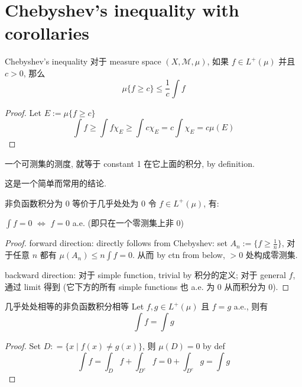 \documentclass[lang=cn,11pt]{elegantbook}
\begin{document}
\section{Chebyshev's inequality with corollaries}

\begin{lemma}{Chebyshev's inequality}
\label{Chebyshev's inequality}
对于 measure space $(X,\mathcal{M}, \mu)$, 如果 $f \in L^+(\mu)$ 并且 $c > 0$, 那么
\[
\mu\{ f \geq c\}  \leq \frac{1}{c} \int f
\]
\end{lemma}\begin{proof}
  Let $E := \mu\{f \geq c\}$
    \[
    \int f \geq \int f \chi_{E} \geq \int c \chi_E = c \int \chi_E = c\mu(E)
    \]
\end{proof}
\begin{remark}
    一个可测集的测度, 就等于 constant 1 在它上面的积分, by definition.

    这是一个简单而常用的结论.
\end{remark}








\begin{proposition}{非负函数积分为 0 等价于几乎处处为 0}
    令 $f \in L^+(\mu)$, 有:
    \begin{center}
        $\displaystyle \int f = 0$ $\Longleftrightarrow$ $f = 0$ a.e. (即只在一个零测集上非 0)
    \end{center}
\end{proposition}
\begin{proof}
    forward direction: directly follows from Chebyshev: set $A_n := \{f \geq \frac{1}{n}\}$, 对于任意 $n$ 都有 $\mu(A_n) \leq n\int f = 0$. 从而 by ctn from below, $>0$ 处构成零测集.
    
    backward direction: 对于 simple function, trivial by 积分的定义; 对于 general $f$, 通过 limit 得到 (它下方的所有 simple functions 也 a.e. 为 0 从而积分为 0).
\end{proof}






\begin{corollary}{几乎处处相等的非负函数积分相等}
Let $f,g \in L^+(\mu)$ 且 $f = g$ a.e., 则有  \[ \int f = \int g\]
\end{corollary}
\begin{proof}
    Set $D : = \{ x \mid f(x) \not = g(x)\}$, 则 $\mu(D) = 0$ by def
    \[
    \int f = \int_{D} f + \int_{D^c} f = 0 + \int_{D^c} g = \int g
    \]
\end{proof}
\end{document}
